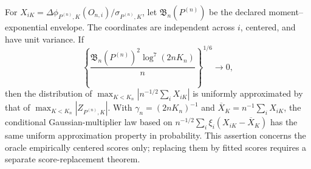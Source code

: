 For \(X_{iK}=\Delta\phi_{P^{(n)},K}(O_{n,i})/\sigma_{P^{(n)},K}\), let \(\mathfrak B_n(P^{(n)})\) be the declared moment--exponential envelope.  The coordinates are independent across \(i\), centered, and have unit variance.  If
\[
 \left\{\frac{\mathfrak B_n(P^{(n)})^2\log^7(2nK_n)}{n}\right\}^{1/6}\longrightarrow0,
\]
then the distribution of \(\max_{K<K_n}|n^{-1/2}\sum_iX_{iK}|\) is uniformly approximated by that of \(\max_{K<K_n}|Z_{P^{(n)},K}|\).  With \(\gamma_n=(2nK_n)^{-1}\) and \(\overline X_K=n^{-1}\sum_iX_{iK}\), the conditional Gaussian-multiplier law based on \(n^{-1/2}\sum_i\xi_i(X_{iK}-\overline X_K)\) has the same uniform approximation property in probability.  This assertion concerns the oracle empirically centered scores only; replacing them by fitted scores requires a separate score-replacement theorem.